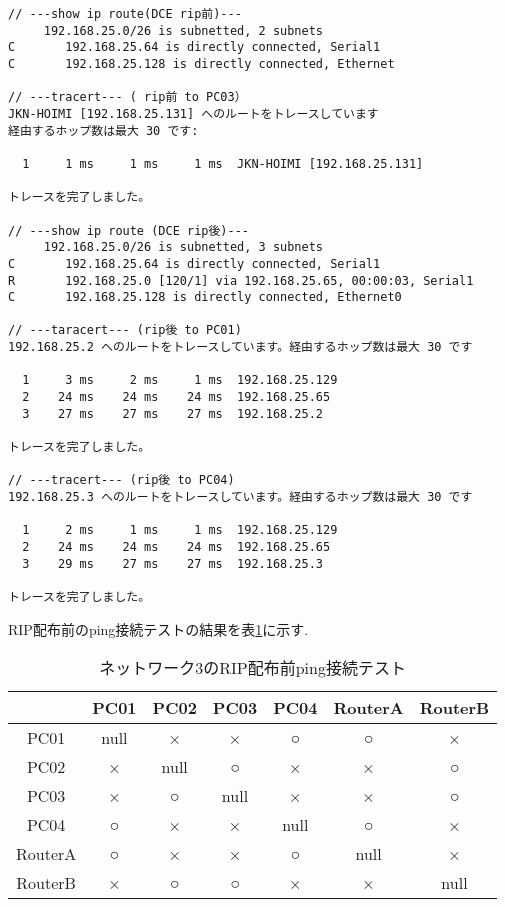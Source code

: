 \documentclass{jsarticle}
\begin{document}
\begin{lstlisting}[basicstyle=\ttfamily\small, frame=single]
// ---show ip route(DCE rip前)---
     192.168.25.0/26 is subnetted, 2 subnets
C       192.168.25.64 is directly connected, Serial1
C       192.168.25.128 is directly connected, Ethernet

// ---tracert--- ( rip前 to PC03）
JKN-HOIMI [192.168.25.131] へのルートをトレースしています
経由するホップ数は最大 30 です:

  1     1 ms     1 ms     1 ms  JKN-HOIMI [192.168.25.131]

トレースを完了しました。

// ---show ip route (DCE rip後)---
     192.168.25.0/26 is subnetted, 3 subnets
C       192.168.25.64 is directly connected, Serial1
R       192.168.25.0 [120/1] via 192.168.25.65, 00:00:03, Serial1
C       192.168.25.128 is directly connected, Ethernet0

// ---taracert--- (rip後 to PC01) 
192.168.25.2 へのルートをトレースしています。経由するホップ数は最大 30 です

  1     3 ms     2 ms     1 ms  192.168.25.129
  2    24 ms    24 ms    24 ms  192.168.25.65
  3    27 ms    27 ms    27 ms  192.168.25.2

トレースを完了しました。

// ---tracert--- (rip後 to PC04)
192.168.25.3 へのルートをトレースしています。経由するホップ数は最大 30 です

  1     2 ms     1 ms     1 ms  192.168.25.129
  2    24 ms    24 ms    24 ms  192.168.25.65
  3    29 ms    27 ms    27 ms  192.168.25.3

トレースを完了しました。
\end{lstlisting}

RIP配布前のping接続テストの結果を表\ref{tab:ping3_nonrip}に示す. 

\begin{table}[htb]
  \begin{center}
    \caption{ネットワーク3のRIP配布前ping接続テスト}
    \begin{tabular}{|c|c|c|c|c|c|c|} \hline
       & PC01 & PC02 & PC03 & PC04 & RouterA & RouterB  \\ \hline 
PC01 & null & × & × & ○ & ○ & ×  \\  \hline
PC02 & × & null & ○ & × & × & ○  \\  \hline
PC03 & × & ○ & null & × & × & ○  \\  \hline
PC04 & ○ & × & × & null & ○ & ×  \\  \hline
RouterA & ○ & × & × & ○ & null & ×  \\  \hline
RouterB & × & ○ & ○ & × & × & null  \\  \hline
    \end{tabular}
	\label{tab:ping3_nonrip}
  \end{center}
\end{table}
\end{document}
